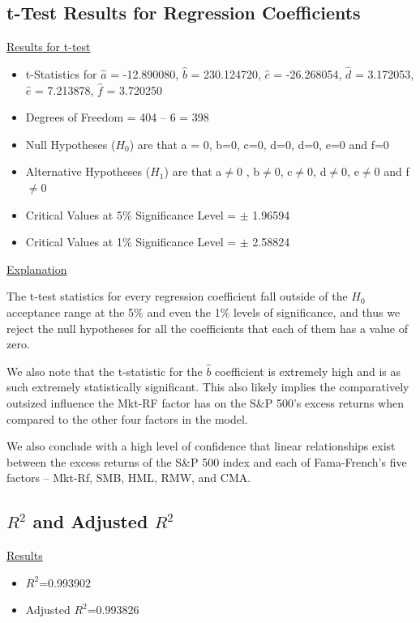 \documentclass[a4paper]{article}
\begin{document}
\subsection{t-Test Results for Regression Coefficients}
\underline{Results for t-test}
\begin{itemize}
	\item t-Statistics for $\hat{a}$ = -12.890080, $\hat{b}$ = 230.124720, $\hat{c}$ = -26.268054, $\hat{d}$ = 3.172053, $\hat{e}$ = 7.213878, $\hat{f}$ = 3.720250
	\item Degrees of Freedom = 404 – 6 = 398
	\item Null Hypotheses ($H_0$) are that a = 0, b=0, c=0, d=0, d=0, e=0 and f=0
	\item Alternative Hypotheses ($H_1$) are that a$\ne$0 , b$\ne$0, c$\ne$0, d$\ne$0, e$\ne$0 and f$\ne$0
	\item Critical Values at 5\% Significance Level = $\pm$ 1.96594
	\item Critical Values at 1\% Significance Level = $\pm$ 2.58824
\end{itemize}

\underline{Explanation}

The t-test statistics for every regression coefficient fall outside of the $H_0$ acceptance range at the 5\% and even the 1\% levels of significance, and thus we reject the null hypotheses for all the coefficients that each of them has a value of zero.

We also note that the t-statistic for the $\hat{b}$ coefficient is extremely high and is as such extremely statistically significant. This also likely implies the comparatively outsized influence the Mkt-RF factor has on the S\&P 500’s excess returns when compared to the other four factors in the model.

We also conclude with a high level of confidence that linear relationships exist between the excess returns of the S\&P 500 index and each of Fama-French’s five factors – Mkt-Rf, SMB, HML, RMW, and CMA. 

\subsection{$R^2$ and Adjusted $R^2$}
\underline{Results}
\begin{itemize}
	\item $R^2$=0.993902
	\item Adjusted $R^2$=0.993826
\end{itemize}
\end{document}
